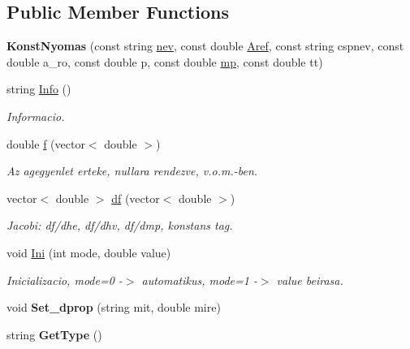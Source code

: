 \subsection*{Public Member Functions}
\begin{DoxyCompactItemize}
\item 
\hypertarget{class_konst_nyomas_a729b5f380b7ea5792484e963b1383f34}{}\label{class_konst_nyomas_a729b5f380b7ea5792484e963b1383f34} 
{\bfseries Konst\+Nyomas} (const string \hyperlink{class_agelem_abe92b7e3912367d5d1caf6b277ca0b7d}{nev}, const double \hyperlink{class_agelem_a3f8668febc2958fd539997d537552f17}{Aref}, const string cspnev, const double a\+\_\+ro, const double p, const double \hyperlink{class_agelem_a1377d80d8511cc4adacccba31d28282d}{mp}, const double tt)
\item 
\hypertarget{class_konst_nyomas_a61f8d31204f60c216808fce1da451c30}{}\label{class_konst_nyomas_a61f8d31204f60c216808fce1da451c30} 
string \hyperlink{class_konst_nyomas_a61f8d31204f60c216808fce1da451c30}{Info} ()
\begin{DoxyCompactList}\small\item\em Informacio. \end{DoxyCompactList}\item 
\hypertarget{class_konst_nyomas_a71a45ebdb2f27a8f69b9988f8ac5f50c}{}\label{class_konst_nyomas_a71a45ebdb2f27a8f69b9988f8ac5f50c} 
double \hyperlink{class_konst_nyomas_a71a45ebdb2f27a8f69b9988f8ac5f50c}{f} (vector$<$ double $>$)
\begin{DoxyCompactList}\small\item\em Az agegyenlet erteke, nullara rendezve, v.\+o.\+m.-\/ben. \end{DoxyCompactList}\item 
\hypertarget{class_konst_nyomas_ab8b056adc0788048a2b32f5378ef07b4}{}\label{class_konst_nyomas_ab8b056adc0788048a2b32f5378ef07b4} 
vector$<$ double $>$ \hyperlink{class_konst_nyomas_ab8b056adc0788048a2b32f5378ef07b4}{df} (vector$<$ double $>$)
\begin{DoxyCompactList}\small\item\em Jacobi\+: df/dhe, df/dhv, df/dmp, konstans tag. \end{DoxyCompactList}\item 
\hypertarget{class_konst_nyomas_a9f949a7c2430ade86328f9f0c5189797}{}\label{class_konst_nyomas_a9f949a7c2430ade86328f9f0c5189797} 
void \hyperlink{class_konst_nyomas_a9f949a7c2430ade86328f9f0c5189797}{Ini} (int mode, double value)
\begin{DoxyCompactList}\small\item\em Inicializacio, mode=0 -\/$>$ automatikus, mode=1 -\/$>$ value beirasa. \end{DoxyCompactList}\item 
\hypertarget{class_konst_nyomas_aebe3ac3a8be035145dbc56429c8d2831}{}\label{class_konst_nyomas_aebe3ac3a8be035145dbc56429c8d2831} 
void {\bfseries Set\+\_\+dprop} (string mit, double mire)
\item 
\hypertarget{class_konst_nyomas_ac142568860665970fab5de0921758f2e}{}\label{class_konst_nyomas_ac142568860665970fab5de0921758f2e} 
string {\bfseries Get\+Type} ()
\end{DoxyCompactItemize}
